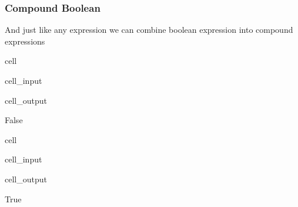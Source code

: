 \documentclass[letterpaper,10pt,english]{jupyterBook}
\begin{document}
\subsubsection{Compound Boolean}
\label{\detokenize{datatypes:compound-boolean}}
\sphinxAtStartPar
And just like any expression we can combine boolean expression into compound expressions

\begin{sphinxuseclass}{cell}\begin{sphinxVerbatimInput}

\begin{sphinxuseclass}{cell_input}
\begin{sphinxVerbatim}[commandchars=\\\{\}]
      
\end{sphinxVerbatim}

\end{sphinxuseclass}\end{sphinxVerbatimInput}
\begin{sphinxVerbatimOutput}

\begin{sphinxuseclass}{cell_output}
\begin{sphinxVerbatim}[commandchars=\\\{\}]
False
\end{sphinxVerbatim}

\end{sphinxuseclass}\end{sphinxVerbatimOutput}

\end{sphinxuseclass}
\begin{sphinxuseclass}{cell}\begin{sphinxVerbatimInput}

\begin{sphinxuseclass}{cell_input}
\begin{sphinxVerbatim}[commandchars=\\\{\}]
  
  
   
\end{sphinxVerbatim}

\end{sphinxuseclass}\end{sphinxVerbatimInput}
\begin{sphinxVerbatimOutput}

\begin{sphinxuseclass}{cell_output}
\begin{sphinxVerbatim}[commandchars=\\\{\}]
True
\end{sphinxVerbatim}

\end{sphinxuseclass}\end{sphinxVerbatimOutput}

\end{sphinxuseclass}
\end{document}
